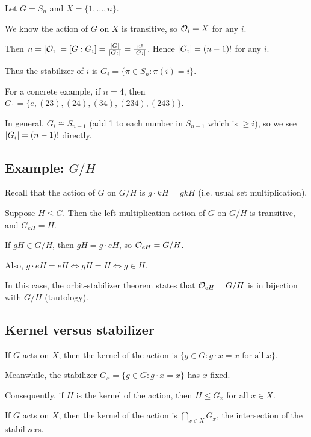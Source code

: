 \documentclass[12pt,letterpaper]{report}
\begin{document}
Let $G = S_n$ and $X = \{1, \ldots, n\}$.

We know the action of $G$ on $X$ is transitive, so $\mathcal{O}_i = X$ for any $i$.

Then $n = \lvert\mathcal{O}_i\rvert = [G : G_i] = \frac{\lvert G\rvert}{\lvert G_i\rvert} = \frac{n!}{\lvert G_i\rvert}$.
Hence $\lvert G_i\rvert = (n - 1)!$ for any $i$.

Thus the stabilizer of $i$ is $G_i = \{\pi \in S_n : \pi(i) = i\}$.

For a concrete example, if $n = 4$, then
$G_1 = \{e, (23), (24), (34), (234), (243)\}$.

In general, $G_i \cong S_{n - 1}$ (add 1 to each number in $S_{n - 1}$ which is $\geq i$), so
we see $\lvert G_i\rvert = (n - 1)!$ directly.

\pagebreak
\subsection[Example: G/H]{Example: $G/H$}

Recall that the action of $G$ on $G/H$ is $g \cdot kH = gkH$ (i.e. usual set multiplication).

\begin{prop}{}{}
  Suppose $H \leq G$.
  Then the left multiplication action of $G$ on $G/H$ is transitive, and $G_{eH} = H$.
\end{prop}

\begin{thmproof}
  If $gH \in G/H$, then $gH = g \cdot eH$, so $\mathcal{O}_{eH} = G/H$.

  Also, $g \cdot eH = eH \iff gH = H \iff g \in H$.
\end{thmproof}

In this case, the orbit-stabilizer theorem states that $\mathcal{O}_{eH} = G/H$ is in bijection with
$G/H$ (tautology).

\pagebreak
\subsection{Kernel versus stabilizer}

If $G$ acts on $X$, then the kernel of the action is
$\{g \in G : g \cdot x = x \text{ for all } x\}$.

Meanwhile, the stabilizer $G_x = \{g \in G : g \cdot x = x\}$ has $x$ fixed.

Consequently, if $H$ is the kernel of the action, then $H \leq G_x$ for all $x \in X$.

\begin{prop}{}{}
  If $G$ acts on $X$, then the kernel of the action is $\bigcap_{x \in X} G_x$, the intersection of
  the stabilizers.
\end{prop}
\end{document}
